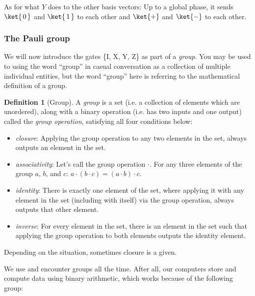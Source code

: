 \documentclass{article}
\theoremstyle{definition}
\newtheorem{definition}{Definition}
\newcommand{\kz}[1]{\ket{\,#1\,}}
\newcommand{\kx}[1]{\ket{#1}}
\begin{document}
As for what $Y$ does to the other basis vectors: Up to a global phase, it sends $\kz0$ and $\kz1$ to each other and $\kx+$ and $\kx-$ to each other.

\subsubsection{The Pauli group}
We will now introduce the gates \{I, X, Y, Z\} as part of a \textit{group}.
You may be used to using the word ``group'' in casual conversation as a collection of multiple individual entities, but the word ``group'' here is referring to the mathematical definition of a group.

\begin{definition}[Group]
	\label{def:group}
	A \textit{group} is a set (i.e. a collection of elements which are unordered), along with a binary operation (i.e. has two inputs and one output) called the \textit{group operation}, satisfying all four conditions below:
	\begin{itemize}
		\item \textit{closure}: Applying the group operation to any two elements in the set, always outputs an element in the set.
		\item \textit{associativity}: Let's call the group operation $\cdot$.  For any three elements of the group $a$, $b$, and $c$: $a \cdot (b \cdot c) = (a \cdot b) \cdot c$.
		\item \textit{identity}: There is exactly one element of the set, where applying it with any element in the set (including with itself) via the group operation, always outputs that other element.
		\item \textit{inverse}: For every element in the set, there is an element in the set such that applying the group operation to both elements outputs the identity element.
	\end{itemize}
\end{definition}
Depending on the situation, sometimes closure is a given.

We use and encounter groups all the time.  After all, our computers store and compute data using binary arithmetic, which works because of the following group:
\end{document}
